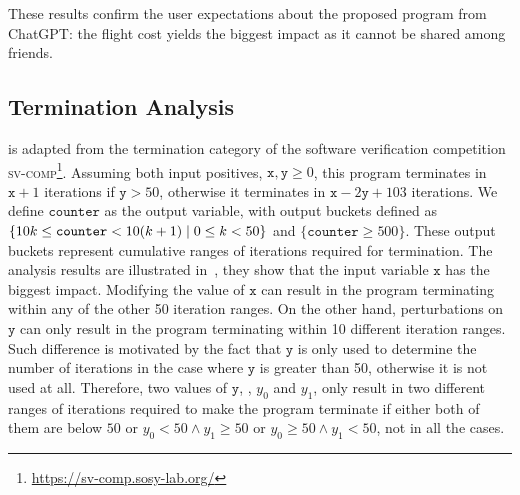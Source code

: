These results confirm the user expectations about the proposed program from ChatGPT: the flight cost yields the biggest impact as it cannot be shared among friends.


\subsection{Termination Analysis}

 is adapted from the termination category of the software verification competition \textsc{sv-comp}\footnote{\url{https://sv-comp.sosy-lab.org/}}.
Assuming both input positives, $\texttt{x},\texttt{y} \ge 0$, this program terminates in $\texttt{x}+1$ iterations if $\texttt{y} >50$, otherwise it terminates in $\texttt{x} - 2\texttt{y} + 103$ iterations.
We define $\texttt{counter}$ as the output variable, with output buckets defined as $\{10k \le \texttt{counter} < 10(k+1) \mid 0 \le k < 50\}$ and $\{\texttt{counter}\ge 500\}$. These output buckets represent cumulative ranges of iterations required for termination.
The analysis results are illustrated in~, they show that the input variable $\texttt{x}$ has the biggest impact.
Modifying the value of $\texttt{x}$ can result in the program terminating within any of the other 50 iteration ranges.
On the other hand, perturbations on $\texttt{y}$ can only result in the program terminating within 10 different iteration ranges.
%
%
Such difference is motivated by the fact that $\texttt{y}$ is only used to determine the number of iterations in the case where $\texttt{y}$ is greater than 50, otherwise it is not used at all. Therefore, two values of $\texttt{y}$, \eg, $y_0$ and $y_1$, only result in two different ranges of iterations required to make the program terminate if either both of them are below $50$ or $y_0 < 50\land y_1 \ge 50$ or $y_0\ge50\land y_1 <50$, not in all the cases.

